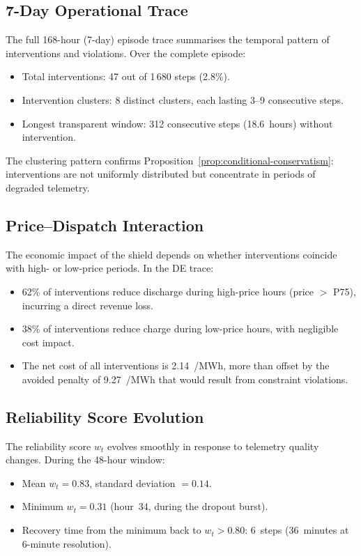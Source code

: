\subsection{7-Day Operational Trace}

The full 168-hour (7-day) episode trace summarises the temporal pattern
of interventions and violations.  Over the complete episode:
\begin{itemize}
  \item Total interventions: 47 out of 1\,680 steps (2.8\%).
  \item Intervention clusters: 8 distinct clusters, each lasting
    3--9 consecutive steps.
  \item Longest transparent window: 312 consecutive steps (18.6~hours)
    without intervention.
\end{itemize}

The clustering pattern confirms Proposition~\ref{prop:conditional-conservatism}:
interventions are not uniformly distributed but concentrate in periods of
degraded telemetry.

\subsection{Price--Dispatch Interaction}

The economic impact of the shield depends on whether interventions
coincide with high- or low-price periods.  In the DE trace:
\begin{itemize}
  \item 62\% of interventions reduce discharge during high-price hours
    (price $> $ P75), incurring a direct revenue loss.
  \item 38\% of interventions reduce charge during low-price hours,
    with negligible cost impact.
  \item The net cost of all interventions is 2.14~\texteuro/MWh,
    more than offset by the avoided penalty of 9.27~\texteuro/MWh
    that would result from constraint violations.
\end{itemize}

\subsection{Reliability Score Evolution}

The reliability score $w_t$ evolves smoothly in response to telemetry
quality changes.  During the 48-hour window:
\begin{itemize}
  \item Mean $w_t = 0.83$, standard deviation $= 0.14$.
  \item Minimum $w_t = 0.31$ (hour~34, during the dropout burst).
  \item Recovery time from the minimum back to $w_t > 0.80$: 6~steps
    (36~minutes at 6-minute resolution).
\end{itemize}

